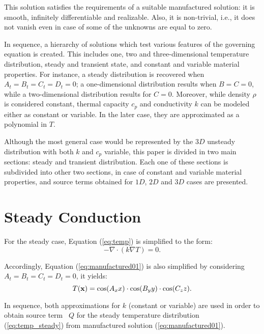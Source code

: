 \documentclass[a4paper,10pt]{article}
\begin{document}
This solution satisfies the requirements of a suitable manufactured solution: it is smooth,
infinitely differentiable and realizable. Also, it is non-trivial, i.e., it does not vanish even in case of
some of the unknowns are equal to zero.


In sequence, a hierarchy of solutions which test various features of the governing equation is created. This includes
one, two and three-dimensional temperature distribution, steady and transient state, and constant and variable
material properties. For instance, a steady distribution is recovered when
$A_t = B_t = C_t = D_t = 0$; a one-dimensional distribution results when $B = C = 0$, while a two-dimensional distribution
results for $C = 0$. Moreover, while density $\rho$ is considered constant, thermal capacity $c_p$ and conductivity $k$
can be modeled either as constant or variable. In the later case, they are approximated as a polynomial in $T$.

Although the most general case would be represented by the $3D$ unsteady distribution with both $k$ and $c_p$ variable,
this paper is divided in two main sections: steady and transient distribution. Each one of these sections is subdivided
into other two sections, in case of constant and variable material properties, and source terms obtained for $1D$, $2D$ and $3D$ cases are presented.


\section{Steady Conduction}
For the steady case, Equation (\ref{eq:temp}) is simplified to the form:
\begin{equation}
 \label{eq:temp_steady}
 - \nabla \cdot (k \nabla T) = 0.
\end{equation}

Accordingly, Equation (\ref{eq:manufactured01}) is also simplified by considering $A_t = B_t = C_t = D_t = 0$, it yields:
\begin{equation}
 \label{eq:manufactured02}
  T ({\bf x}) = \cos(A_x x ) \cdot \cos(B_y y ) \cdot \cos(C_z z ).
\end{equation}

In sequence, both approximations for $k$ (constant or variable) are used in order to obtain source term~ $Q$ for the steady temperature
distribution (\ref{eq:temp_steady}) from manufactured solution (\ref{eq:manufactured01}).
\end{document}
